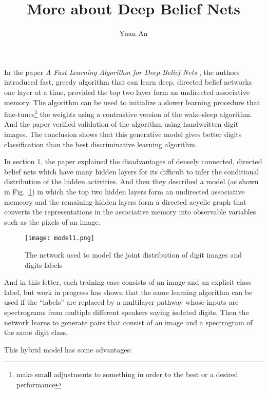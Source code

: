\documentclass[a4paper,12pt,twocolumn]{article}
\title{More about Deep Belief Nets}
\author{Yuan An}
\begin{document}
\maketitle
In the paper \emph{A Fast Learning Algorithm for Deep Belief Nets} \cite{DBNpaper}, the authors introduced fast, greedy algorithm that can learn deep, directed belief networks one layer at a time, provided the top two layer form an undirected associative memory. The algorithm can be used to initialize a slower learning procedure that fine-tunes\footnote{make small adjustments to something in order to the best or a desired performance} the weights using a contrastive version of the wake-sleep algorithm. And the paper verified validation of the algorithm using handwritten digit images. The conclusion shows that this generative model gives better digits classification than the best discriminative learning algorithm.
\par
In section 1, the paper explained the disadvantages of densely connected, directed belief nets which have many hidden layers for its difficult to infer the conditional distribution of the hidden activities. And then they described a model (as shown in Fig.~\ref{fig.1}) in which the top two hidden layers form an undirected associative memeory and the remaining hidden layers form a directed acyclic graph that converts the representations in the associative memory into observable variables such as the pixels of an image.
\begin{figure}[h]
	\centering
	\texttt{[image: model1.png]}
	\caption{The network used to model the joint distribution of digit images and digits labels}\label{fig.1}
\end{figure}
\par
And in this letter, each training case consists of an image and an explicit class label, but work in progress has shown that the same learning algorithm can be used if the ``labels'' are replaced by a multilayer pathway whose inputs are spectrograms from multiple different speakers saying isolated digits. Then the network learns to generate pairs that consist of an image and a spectrogram of the same digit class.
\par
This hybrid model has some advantages:
\end{document}
